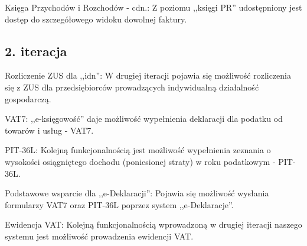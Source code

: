 \documentclass{beamer}
\begin{document}
  \begin{frame}
    \begin{block}{}
      Księga Przychodów i Rozchodów - cdn.: Z poziomu ,,księgi PR'' udostępniony jest dostęp do szczegółowego widoku dowolnej faktury.
    \end{block}
  \end{frame}
\subsection{2. iteracja}
  \begin{frame}
    \begin{block}{}
      Rozliczenie ZUS dla ,,idn'': W drugiej iteracji pojawia się możliwość rozliczenia się z ZUS dla przedsiębiorców prowadzących indywidualną działalność gospodarczą.
    \end{block}
  \end{frame}
  \begin{frame}
    \begin{block}{}
      VAT7: ,,e-księgowość'' daje możliwość wypełnienia deklaracji dla podatku od towarów i usług - VAT7.
    \end{block}
  \end{frame}
  \begin{frame}
    \begin{block}{}
      PIT-36L: Kolejną funkcjonalnością jest możliwość wypełnienia zeznania o wysokości osiągniętego dochodu (poniesionej straty) w roku podatkowym - PIT-36L.
    \end{block}
  \end{frame}
  \begin{frame}
    \begin{block}{}
      Podstawowe wsparcie dla ,,e-Deklaracji'': Pojawia się możliwość wysłania formularzy VAT7 oraz PIT-36L poprzez system ,,e-Deklaracje''.
    \end{block}
  \end{frame}
  \begin{frame}
    \begin{block}{}
      Ewidencja VAT: Kolejną funkcjonalnością wprowadzoną w drugiej iteracji naszego systemu jest możliwość prowadzenia ewidencji VAT.
    \end{block}
  \end{frame}
\end{document}

